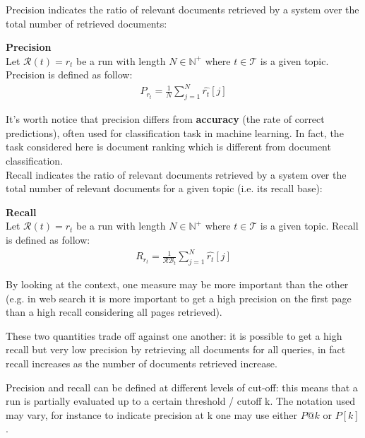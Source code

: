 Precision indicates the ratio of relevant documents retrieved by a system over the total number of retrieved documents:

\begin{definition}{\textbf{Precision}}\\

Let $\mathcal{R}(t)=r_t$ be a run with length $N \in \mathbb{N}^+$ where $t \in \mathcal{T}$ is a given topic. Precision is defined as follow:
\begin{align*}
P_{r_t} = \frac{1}{N} \sum_{j = 1}^N \hat{r_t}[j]
\end{align*}

\end{definition}

It's worth notice that precision differs from \textbf{accuracy} (the rate of correct predictions), often used for classification task in machine learning. In fact, the task considered here is document ranking which is different from document classification.\\

Recall indicates the ratio of relevant documents retrieved by a system over the total number of relevant documents for a given topic (i.e. its recall base):

\begin{definition}{\textbf{Recall}}\\

Let $\mathcal{R}(t)=r_t$ be a run with length $N \in \mathbb{N}^+$ where $t \in \mathcal{T}$ is a given topic. Recall is defined as follow:
\begin{align*}
R_{r_t} = \frac{1}{\mathcal{RB}_t} \sum_{j = 1}^N \hat{r_t}[j]
\end{align*}

\end{definition}

By looking at the context, one measure may be more important than the other
(e.g. in web search it is more important to get a high precision on the first
page than a high recall considering all pages retrieved).

These two quantities trade off against one another: it is possible to get a high recall
but very low precision by retrieving all documents for all queries, in fact
recall increases as the number of documents retrieved increase.

Precision and recall can be defined at different levels of cut-off: this means that a run is partially evaluated up to a certain threshold / cutoff k. The notation used may vary, for instance to indicate precision at k one may use either $P@k$ or $P[k]$.

